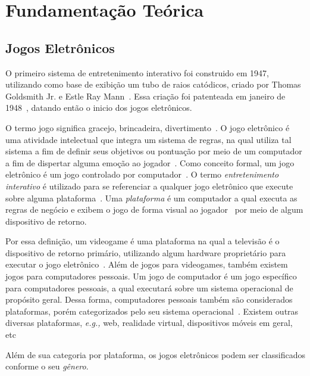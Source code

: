 \chapter{Fundamentação Teórica}
\label{cap2}

\section{Jogos Eletrônicos}

O primeiro sistema de entretenimento interativo foi construido em 1947, utilizando como base de exibição um tubo de raios catódicos, criado por Thomas Goldsmith Jr. e Estle Ray Mann~\cite{Adams2014Jan}.
%
Essa criação foi patenteada em janeiro de 1948~\cite{patents1947Jan}, datando então o inicio dos jogos eletrônicos.



O termo jogo significa gracejo, brincadeira, divertimento~\cite{Adams2014Jan}.
%
O jogo eletrônico é uma atividade intelectual que integra um sistema de regras, na qual utiliza tal sistema a fim de definir seus objetivos ou pontuação por meio de um computador a fim de dispertar alguma emoção ao jogador~\cite{video_game_technologies}.
%
Como conceito formal, um jogo eletrônico é um jogo controlado por computador~\cite{Adams2014Jan}.
%
O termo \textit{entretenimento interativo} é utilizado para se referenciar a qualquer jogo eletrônico que execute sobre alguma plataforma~\cite{video_game_technologies}.
%
Uma \textit{plataforma} é um computador a qual executa as regras de negócio e exibem o jogo de forma visual ao jogador~\cite{video_game_technologies} por meio de algum dispositivo de retorno.



Por essa definição, um videogame é uma plataforma na qual a televisão é o dispositivo de retorno primário, utilizando algum hardware proprietário para executar o jogo eletrônico~\cite{video_game_technologies}.
%
Além de jogos para videogames, também existem jogos para computadores pessoais.
%
Um jogo de computador é um jogo específico para computadores pessoais, a qual executará sobre um sistema operacional de propósito geral.
%
Dessa forma, computadores pessoais também são considerados plataformas, porém categorizados pelo seu sistema operacional~\cite{video_game_technologies}.
%
Existem outras diversas plataformas, \textit{e.g.,} web, realidade virtual, dispositivos móveis em geral, etc


Além de sua categoria por plataforma, os jogos eletrônicos podem ser classificados conforme o seu \textit{gênero}.




